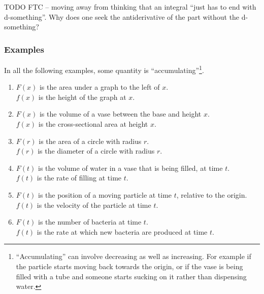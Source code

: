 TODO FTC -- moving away from thinking that an integral ``just has to end with
d-something''. Why does one seek the antiderivative of the part without the
d-something?

\subsubsection*{Examples}

In all the following examples, some quantity is
``accumulating''\footnote{``Accumulating'' can involve decreasing as well as
  increasing. For example if the particle starts moving back towards the
  origin, or if the vase is being filled with a tube and someone starts sucking
  on it rather than dispensing water.}.

\begin{enumerate}
\item $F(x)$ is the area under a graph to the left of $x$.\\
      $f(x)$ is the height of the graph at $x$.\\

\item $F(x)$ is the volume of a vase between the base and height $x$. \\
      $f(x)$ is the cross-sectional area at height $x$.\\

\item $F(r)$ is the area of a circle with radius $r$.\\
      $f(r)$ is the diameter of a circle with radius $r$.\\

\item $F(t)$ is the volume of water in a vase that is being filled, at time $t$.\\
      $f(t)$ is the rate of filling at time $t$.\\

\item $F(t)$ is the position of a moving particle at time $t$, relative to the origin.\\
      $f(t)$ is the velocity of the particle at time $t$.\\

\item $F(t)$ is the number of bacteria at time $t$.\\
      $f(t)$ is the rate at which new bacteria are produced at time $t$.
\end{enumerate}

